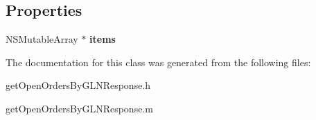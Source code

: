 \subsection*{Properties}
\begin{DoxyCompactItemize}
\item 
\hypertarget{interfaceget_open_orders_by_g_l_n_response_a432227b7a87e349fc676aad8ddef895e}{}N\+S\+Mutable\+Array $\ast$ {\bfseries items}\label{interfaceget_open_orders_by_g_l_n_response_a432227b7a87e349fc676aad8ddef895e}

\end{DoxyCompactItemize}


The documentation for this class was generated from the following files\+:\begin{DoxyCompactItemize}
\item 
get\+Open\+Orders\+By\+G\+L\+N\+Response.\+h\item 
get\+Open\+Orders\+By\+G\+L\+N\+Response.\+m\end{DoxyCompactItemize}
